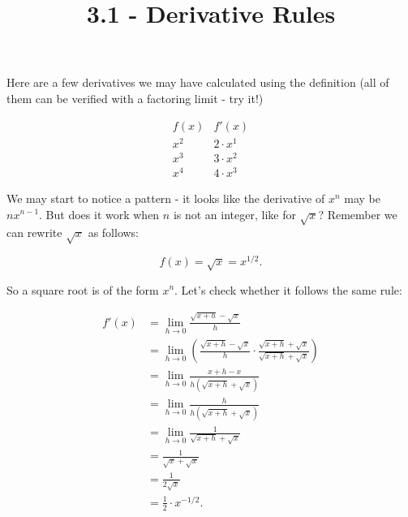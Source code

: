 \documentclass{ximera}
\title{3.1 - Derivative Rules}
\begin{document}
\begin{abstract}
\end{abstract}
\maketitle


\renewcommand{\d}{\mathop{}\!d}

Here are a few derivatives we may have calculated using the definition (all of them can be verified with a factoring limit - try it!)

{  \renewcommand*{\arraystretch}{1.3}
  \[
  \begin{array}{c|c}
    f(x) & f'(x)\\ \hline
    x^2 & 2\cdot x^1\\
    x^3 & 3\cdot x^2\\
    x^4 & 4\cdot x^3
  \end{array}
  \]
  }

We may start to notice a pattern - it looks like the derivative of $x^n$ may be $nx^{n-1}$. But does it work when $n$ is not an integer, like for $\sqrt x$? Remember we can rewrite $\sqrt x$ as follows:


  \[
  f(x) = \sqrt{x} = x^{1/2}.
  \]

  So a square root is of the form $x^n$. Let's check whether it follows the same rule:


  \begin{align*}
    f'(x) &= \lim_{h\to 0} \frac{\sqrt{x+h} -\sqrt{x}}{h}\\
    &= \lim_{h\to 0} \left(\frac{\sqrt{x+h} - \sqrt{x}}{h}\cdot \frac{\sqrt{x+h} + \sqrt{x}}{\sqrt{x+h} + \sqrt{x}}\right)\\
    &= \lim_{h\to 0} \frac{x+h - x}{h(\sqrt{x+h} + \sqrt{x})}\\
    &= \lim_{h\to 0} \frac{h}{h(\sqrt{x+h} + \sqrt{x})}\\
    &= \lim_{h\to 0} \frac{1}{\sqrt{x+h} + \sqrt{x}}\\
    &= \frac{1}{\sqrt{x} + \sqrt{x}}\\
    &= \frac{1}{2\sqrt{x}}\\
    &= \frac{1}{2}\cdot x^{-1/2}.
  \end{align*}
\end{document}

